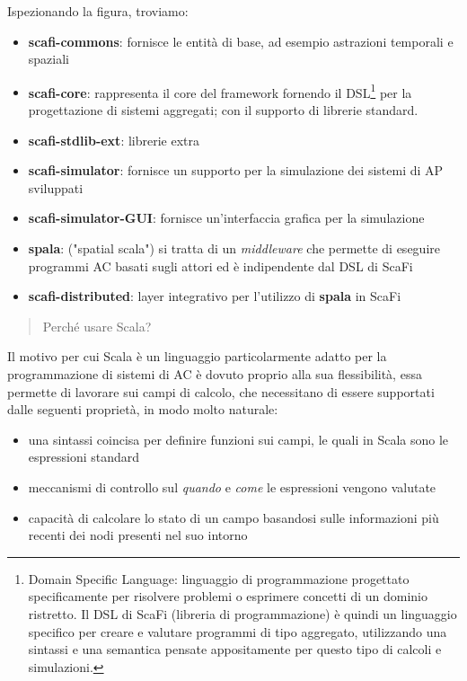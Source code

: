 \documentclass[12pt,a4paper,openright,twoside]{book}
\begin{document}
Ispezionando la figura, troviamo:

\begin{itemize}
    \item \textbf{scafi-commons}: fornisce le entità di base, ad esempio astrazioni temporali e spaziali
    \item \textbf{scafi-core}: rappresenta il core del framework fornendo il DSL\footnote{Domain Specific Language: linguaggio di programmazione progettato specificamente per risolvere problemi o esprimere concetti di un dominio ristretto. Il DSL di ScaFi (libreria di programmazione) è quindi un linguaggio specifico per creare e valutare programmi di tipo aggregato, utilizzando una sintassi e una semantica pensate appositamente per questo tipo di calcoli e simulazioni.} per la progettazione di sistemi aggregati; con il supporto di librerie standard.
    \item \textbf{scafi-stdlib-ext}: librerie extra
    \item \textbf{scafi-simulator}: fornisce un supporto per la simulazione dei sistemi di \ac{AP} sviluppati
    \item \textbf{scafi-simulator-GUI}: fornisce un'interfaccia grafica per la simulazione
    \item \textbf{spala}: ("spatial scala") si tratta di un \textit{middleware} che permette di eseguire programmi \ac{AC} basati sugli attori ed è indipendente dal DSL di ScaFi
    \item \textbf{scafi-distributed}: layer integrativo per l'utilizzo di \textbf{spala} in ScaFi
\end{itemize}

\begin{quote}
    \centering
    Perché usare Scala?
\end{quote}

Il motivo per cui Scala è un linguaggio particolarmente adatto per la programmazione di sistemi di \ac{AC} è dovuto proprio alla sua flessibilità, essa permette di lavorare sui campi di calcolo, che necessitano di essere supportati dalle seguenti proprietà, in modo molto naturale:

\begin{itemize}
    \item una sintassi coincisa per definire funzioni sui campi, le quali in Scala sono le espressioni standard
    \item meccanismi di controllo sul \textit{quando} e \textit{come} le espressioni vengono valutate
    \item capacità di calcolare lo stato di un campo basandosi sulle informazioni più recenti dei nodi presenti nel suo intorno
\end{itemize}
\end{document}
